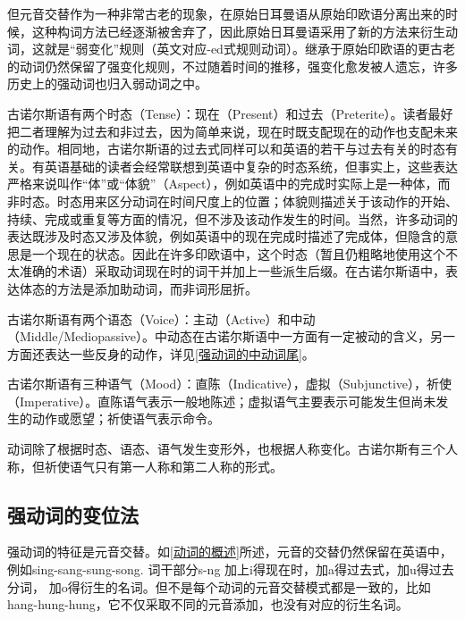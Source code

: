 但元音交替作为一种非常古老的现象，在原始日耳曼语从原始印欧语分离出来的时候，这种构词方法已经逐渐被舍弃了，因此原始日耳曼语采用了新的方法来衍生动词，这就是``弱变化''规则（英文对应-ed式规则动词）。继承于原始印欧语的更古老的动词仍然保留了强变化规则，不过随着时间的推移，强变化愈发被人遗忘，许多历史上的强动词也归入弱动词之中。

古诺尔斯语有两个时态（Tense）：现在（Present）和过去（Preterite）。读者最好把二者理解为过去和非过去，因为简单来说，现在时既支配现在的动作也支配未来的动作。相同地，古诺尔斯语的过去式同样可以和英语的若干与过去有关的时态有关。有英语基础的读者会经常联想到英语中复杂的时态系统，但事实上，这些表达严格来说叫作``体''或``体貌''（Aspect），例如英语中的完成时实际上是一种体，而非时态。时态用来区分动词在时间尺度上的位置；体貌则描述关于该动作的开始、持续、完成或重复等方面的情况，但不涉及该动作发生的时间。当然，许多动词的表达既涉及时态又涉及体貌，例如英语中的现在完成时描述了完成体，但隐含的意思是一个现在的状态。因此在许多印欧语中，这个时态（暂且仍粗略地使用这个不太准确的术语）采取动词现在时的词干并加上一些派生后缀。在古诺尔斯语中，表达体态的方法是添加助动词，而非词形屈折。

古诺尔斯语有两个语态（Voice）：主动（Active）和中动（Middle/Mediopassive）。中动态在古诺尔斯语中一方面有一定被动的含义，另一方面还表达一些反身的动作，详见\ref{强动词的中动词尾}。

古诺尔斯语有三种语气（Mood）：直陈（Indicative），虚拟（Subjunctive），祈使（Imperative）。直陈语气表示一般地陈述；虚拟语气主要表示可能发生但尚未发生的动作或愿望；祈使语气表示命令。

动词除了根据时态、语态、语气发生变形外，也根据人称变化。古诺尔斯有三个人称，但祈使语气只有第一人称和第二人称的形式。

\subsection{强动词的变位法}\label{强动词的变位法}

强动词的特征是元音交替。如\ref{动词的概述}所述，元音的交替仍然保留在英语中，例如sing-sang-sung-song.
词干部分s-ng 加上i得现在时，加a得过去式，加u得过去分词，
加o得衍生的名词。但不是每个动词的元音交替模式都是一致的，比如hang-hung-hung，它不仅采取不同的元音添加，也没有对应的衍生名词。

